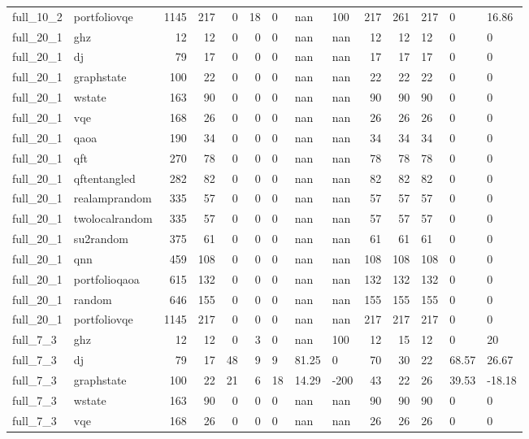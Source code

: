 \begin{longtable}{llrrrrlllrrlll}
full\_10\_2 & portfoliovqe & 1145 & 217 & 0 & 18 & 0 & nan & 100 & 217 & 261 & 217 & 0 & 16.86 \\
full\_20\_1 & ghz & 12 & 12 & 0 & 0 & 0 & nan & nan & 12 & 12 & 12 & 0 & 0 \\
full\_20\_1 & dj & 79 & 17 & 0 & 0 & 0 & nan & nan & 17 & 17 & 17 & 0 & 0 \\
full\_20\_1 & graphstate & 100 & 22 & 0 & 0 & 0 & nan & nan & 22 & 22 & 22 & 0 & 0 \\
full\_20\_1 & wstate & 163 & 90 & 0 & 0 & 0 & nan & nan & 90 & 90 & 90 & 0 & 0 \\
full\_20\_1 & vqe & 168 & 26 & 0 & 0 & 0 & nan & nan & 26 & 26 & 26 & 0 & 0 \\
full\_20\_1 & qaoa & 190 & 34 & 0 & 0 & 0 & nan & nan & 34 & 34 & 34 & 0 & 0 \\
full\_20\_1 & qft & 270 & 78 & 0 & 0 & 0 & nan & nan & 78 & 78 & 78 & 0 & 0 \\
full\_20\_1 & qftentangled & 282 & 82 & 0 & 0 & 0 & nan & nan & 82 & 82 & 82 & 0 & 0 \\
full\_20\_1 & realamprandom & 335 & 57 & 0 & 0 & 0 & nan & nan & 57 & 57 & 57 & 0 & 0 \\
full\_20\_1 & twolocalrandom & 335 & 57 & 0 & 0 & 0 & nan & nan & 57 & 57 & 57 & 0 & 0 \\
full\_20\_1 & su2random & 375 & 61 & 0 & 0 & 0 & nan & nan & 61 & 61 & 61 & 0 & 0 \\
full\_20\_1 & qnn & 459 & 108 & 0 & 0 & 0 & nan & nan & 108 & 108 & 108 & 0 & 0 \\
full\_20\_1 & portfolioqaoa & 615 & 132 & 0 & 0 & 0 & nan & nan & 132 & 132 & 132 & 0 & 0 \\
full\_20\_1 & random & 646 & 155 & 0 & 0 & 0 & nan & nan & 155 & 155 & 155 & 0 & 0 \\
full\_20\_1 & portfoliovqe & 1145 & 217 & 0 & 0 & 0 & nan & nan & 217 & 217 & 217 & 0 & 0 \\
full\_7\_3 & ghz & 12 & 12 & 0 & 3 & 0 & nan & 100 & 12 & 15 & 12 & 0 & 20 \\
full\_7\_3 & dj & 79 & 17 & 48 & 9 & 9 & 81.25 & 0 & 70 & 30 & 22 & 68.57 & 26.67 \\
full\_7\_3 & graphstate & 100 & 22 & 21 & 6 & 18 & 14.29 & -200 & 43 & 22 & 26 & 39.53 & -18.18 \\
full\_7\_3 & wstate & 163 & 90 & 0 & 0 & 0 & nan & nan & 90 & 90 & 90 & 0 & 0 \\
full\_7\_3 & vqe & 168 & 26 & 0 & 0 & 0 & nan & nan & 26 & 26 & 26 & 0 & 0 \\

\end{longtable}

